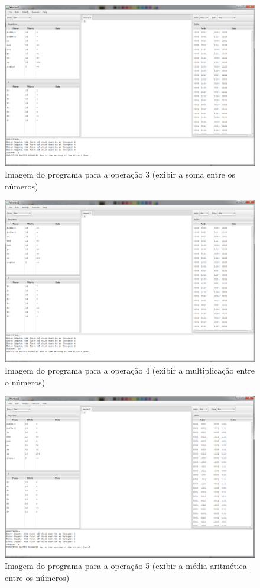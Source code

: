 \documentclass{article}
\begin{document}
\begin{figure}[!]
\centering
\includegraphics[scale=0.34]{3.png}
\caption{Imagem do programa para a operação 3 (exibir a soma entre os números)}
\label{fig:ibagem3}
\end{figure}


\begin{figure}[!]
\centering
\includegraphics[scale=0.34]{4.png}
\caption{Imagem do programa para a operação 4 (exibir a multiplicação entre o números)}
\label{fig:ibagem4}
\end{figure}

\begin{figure}[!]
\centering
\includegraphics[scale=0.34]{5.png}
\caption{Imagem do programa para a operação 5 (exibir a média aritmética entre os números)}
\label{fig:ibagem5}
\end{figure}
\end{document}
